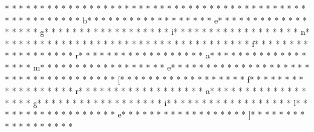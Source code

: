 * * *  * * *  * * *  *  * * *  *  * * *  * %
* * *  * * *  * * *  *  * * *  *  * * *  * 
* * *  * * *  * * *  *  * * *  *  * * *  * b* * *  * * *  * * *  *  * * *  *  * * *  * e* * *  * * *  * * *  *  * * *  *  * * *  * g* * *  * * *  * * *  *  * * *  *  * * *  * i* * *  * * *  * * *  *  * * *  *  * * *  * n* * *  * * *  * * *  *  * * *  *  * * *  * {* * *  * * *  * * *  *  * * *  *  * * *  * f* * *  * * *  * * *  *  * * *  *  * * *  * r* * *  * * *  * * *  *  * * *  *  * * *  * a* * *  * * *  * * *  *  * * *  *  * * *  * m* * *  * * *  * * *  *  * * *  *  * * *  * e* * *  * * *  * * *  *  * * *  *  * * *  * }* * *  * * *  * * *  *  * * *  *  * * *  * [* * *  * * *  * * *  *  * * *  *  * * *  * f* * *  * * *  * * *  *  * * *  *  * * *  * r* * *  * * *  * * *  *  * * *  *  * * *  * a* * *  * * *  * * *  *  * * *  *  * * *  * g* * *  * * *  * * *  *  * * *  *  * * *  * i* * *  * * *  * * *  *  * * *  *  * * *  * l* * *  * * *  * * *  *  * * *  *  * * *  * e* * *  * * *  * * *  *  * * *  *  * * *  * ]* * *  * * *  * * *  *  * * *  *  * * *  * 
